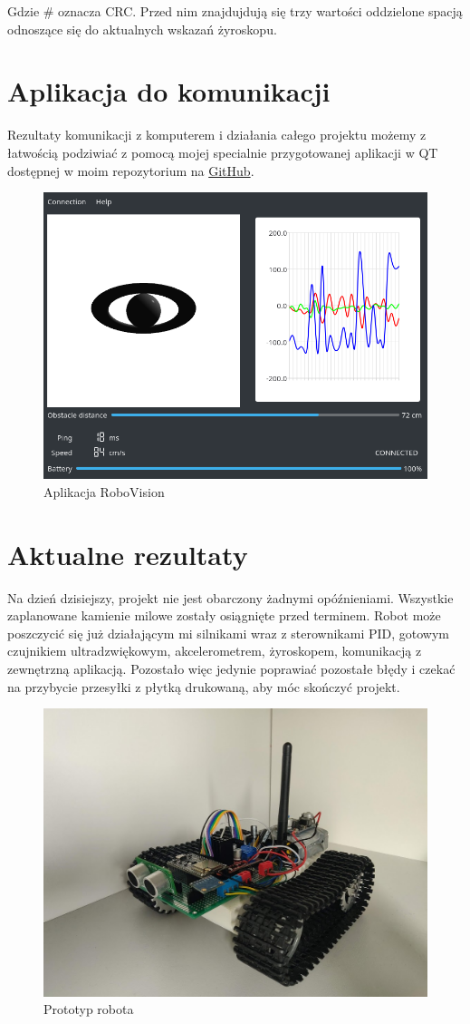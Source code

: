 \documentclass[10pt, a4paper]{article}
\begin{document}
Gdzie \# oznacza CRC. Przed nim znajdujdują się trzy wartości oddzielone spacją
odnoszące się do aktualnych wskazań żyroskopu.


\section{Aplikacja do komunikacji}
Rezultaty komunikacji z komputerem i działania całego projektu możemy z
łatwością podziwiać z pomocą mojej specialnie przygotowanej aplikacji w QT
dostępnej w moim repozytorium na
\href{https://github.com/mbober1/RoboVision}{GitHub}.

\begin{figure}[H]
	\centering
	\includegraphics[width=1\textwidth]{figures/app.png}
	\caption{Aplikacja RoboVision}
	\label{fig:app}
\end{figure}


\section{Aktualne rezultaty}
Na dzień dzisiejszy, projekt nie jest obarczony żadnymi opóźnieniami. Wszystkie 
zaplanowane kamienie milowe zostały osiągnięte przed terminem. Robot może 
poszczycić się już działającym mi silnikami wraz z sterownikami PID, gotowym
czujnikiem ultradzwiękowym, akcelerometrem, żyroskopem, komunikacją z 
zewnętrzną aplikacją. Pozostało więc jedynie poprawiać pozostałe błędy i 
czekać na przybycie przesyłki z płytką drukowaną, aby móc skończyć projekt. 

\begin{figure}[H]
	\centering
	\includegraphics[width=1\textwidth]{figures/robotv1.jpg}
	\caption{Prototyp robota}
	\label{fig:robot}
\end{figure}
\end{document}

